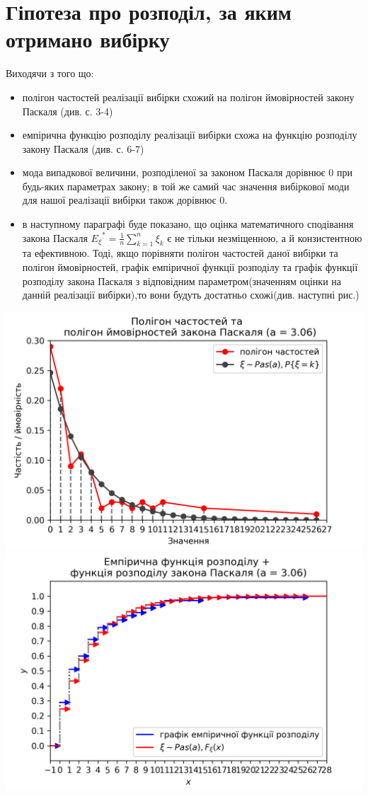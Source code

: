 \documentclass{article}
\begin{document}
\section{Гіпотеза про розподіл, за яким отримано вибірку}
Виходячи з того що:
\begin{itemize}
  \item полігон частостей реалізації вибірки схожий на полігон 
  ймовірностей закону Паскаля (див. с. 3-4)
  \item емпірична функцію розподілу реалізації вибірки схожа на
  функцію розподілу закону Паскаля (див. с. 6-7)
  \item мода випадкової величини, розподіленої за законом Паскаля
  дорівнює 0 при будь-яких параметрах закону; в той же самий час 
  значення вибіркової моди для нашої реалізації вибірки також
  дорівнює 0.
  \item в наступному параграфі буде показано, що оцінка математичного 
  сподівання закона Паскаля ${E_\xi}^* = \frac{1}{n} 
  \sum_{k=1}^{n}\xi_k$ є не тільки 
  незміщенною, а й конзистентною та ефективною. Тоді, якщо порівняти 
  полігон частостей даної вибірки та полігон ймовірностей, графік 
  емпіричної функції розподілу та графік функції розподілу закона 
  Паскаля з відповідним параметром(значенням оцінки на данній 
  реалізації вибірки),то вони будуть достатньо схожі(див. 
  наступні рис.)
\end{itemize}
\includegraphics[scale = 0.8]{hypotesis1.png}
\newline
\includegraphics[scale = 0.8]{hypotesis2.png}
\end{document}
